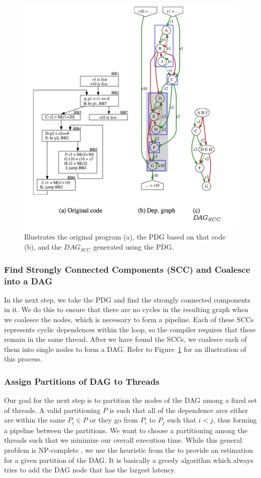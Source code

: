 \documentclass[11pt, letter]{article}
\begin{document}
\begin{figure}
\includegraphics[scale=0.75]{pdg}
\caption{Illustrates the original program (a), the PDG based on that code (b), and the $DAG_{SCC}$ generated using the PDG.}
\label{pdg}
\end{figure}

\subsubsection{Find Strongly Connected Components (SCC) and Coalesce into a DAG}
In the next step, we take the PDG and find the strongly connected components \cite{CLRS} in it.  We do this to ensure that there are no cycles in the resulting graph when we coalesce the nodes, which is necessary to form a pipeline.  Each of these SCCs represents cyclic dependences within the loop, so the compiler requires that these remain in the same thread.  After we have found the SCCs, we coalesce each of them into single nodes to form a DAG.  Refer to Figure~\ref{pdg} for an illustration of this process.

\subsubsection{Assign Partitions of DAG to Threads}
Our goal for the next step is to partition the nodes of the DAG among a fixed set of threads.  A valid partitioning $P$ is such that all of the dependence arcs either are within the same $P_i \in P$ or they go from $P_i$ to $P_j$ such that $i < j$, thus forming a pipeline between the partitions.  We want to choose a partitioning among the threads such that we minimize our overall execution time.  While this general problem is NP-complete \cite{DSWP-OR}, we use the heuristic from the \cite{DSWP-OR} to provide an estimation for a given partition of the DAG. It is basically a greedy algorithm which always tries to add the DAG node that has the largest latency.
\end{document}
